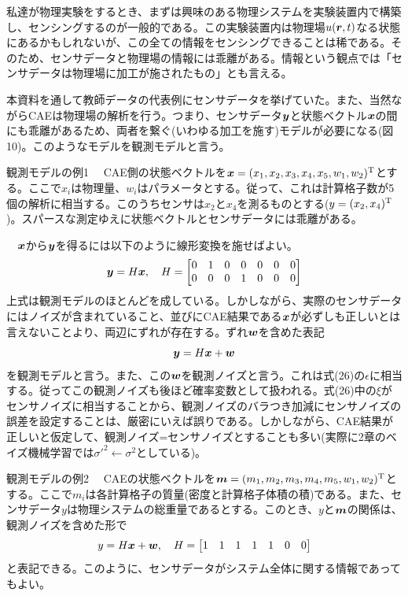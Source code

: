 \documentclass[dvipdfmx, 9pt, a4paper]{jsarticle}
\newcommand{\bm}[1]{{\mbox{\boldmath $#1$}}}
\begin{document}
私達が物理実験をするとき、まずは興味のある物理システムを実験装置内で構築し、センシングするのが一般的である。この実験装置内は物理場$u(\bm r, t)$なる状態にあるかもしれないが、この全ての情報をセンシングできることは稀である。そのため、センサデータと物理場の情報には乖離がある。情報という観点では「センサデータは物理場に加工が施されたもの」とも言える。\par
本資料を通して教師データの代表例にセンサデータを挙げていた。また、当然ながらCAEは物理場の解析を行う。つまり、センサデータ$\bm y$と状態ベクトル$\bm x$の間にも乖離があるため、両者を繋ぐ(いわゆる加工を施す)モデルが必要になる(図10)。このようなモデルを観測モデルと言う。\bigskip
\begin{itembox}[l]{観測モデルの例1}
　CAE側の状態ベクトルを$\bm x=(x_1, x_2, x_3, x_4, x_5, w_1, w_2)^{\rm T}$とする。ここで$x_i$は物理量、$w_i$はパラメータとする。従って、これは計算格子数が5個の解析に相当する。このうちセンサは$x_2$と$x_4$を測るものとする($y=(x_2, x_4)^{\rm T}$)。スパースな測定ゆえに状態ベクトルとセンサデータには乖離がある。\par
　$\bm x$から$\bm y$を得るには以下のように線形変換を施せばよい。
\begin{equation}
\bm y=H\bm x, ~~~
H=
\begin{bmatrix}
0 & 1 & 0 & 0 & 0 & 0 & 0 \\
0 & 0 & 0 & 1 & 0 & 0 & 0 \\
\end{bmatrix} \notag
\end{equation}
上式は観測モデルのほとんどを成している。しかしながら、実際のセンサデータにはノイズが含まれていること、並びにCAE結果である$\bm x$が必ずしも正しいとは言えないことより、両辺にずれが存在する。ずれ$\bm w$を含めた表記
\begin{equation}
\bm y=H\bm x+\bm w \notag
\end{equation}
を観測モデルと言う。また、この$\bm w$を観測ノイズと言う。これは式(26)の$\epsilon$に相当する。従ってこの観測ノイズも後ほど確率変数として扱われる。式(26)中の$\xi$がセンサノイズに相当することから、観測ノイズのバラつき加減にセンサノイズの誤差を設定することは、厳密にいえば誤りである。しかしながら、CAE結果が正しいと仮定して、観測ノイズ=センサノイズとすることも多い(実際に2章のベイズ機械学習では$\sigma'^2 \leftarrow \sigma^2$としている)。
\end{itembox}
\begin{itembox}[l]{観測モデルの例2}
　CAEの状態ベクトルを$\bm m=(m_1, m_2, m_3, m_4, m_5, w_1, w_2)^{\rm T}$とする。ここで$m_i$は各計算格子の質量(密度と計算格子体積の積)である。また、センサデータ$y$は物理システムの総重量であるとする。このとき、$y$と$\bm m$の関係は、観測ノイズを含めた形で
\begin{equation}
y=H\bm x+\bm w,~~~ H=
\begin{bmatrix}
1 & 1 & 1 & 1 & 1 & 0 & 0
\end{bmatrix}\notag
\end{equation}
と表記できる。このように、センサデータがシステム全体に関する情報であってもよい。
\end{itembox}
\end{document}
